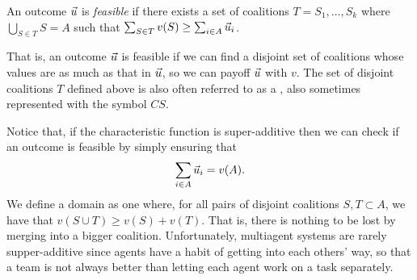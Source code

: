 \begin{definition}[Feasible]
  An outcome $\vec{u}$ is \emph{feasible} if there exists a set of
  coalitions $T = S_1,\ldots,S_k$ where $\bigcup_{S \in T} S = A$
  such that $\sum_{S \in T} v(S) \geq \sum_{i \in A} \vec{u}_i$.
\end{definition}

That is, an outcome $\vec{u}$ is feasible if we can find a disjoint set of
coalitions whose values are as much as that in $\vec{u}$, so we can payoff
$\vec{u}$ with $v$. The set of disjoint coalitions $T$ defined above is
also often referred to as a , also sometimes
represented with the symbol $CS$.

Notice that, if the characteristic function is super-additive then we
can check if an outcome \vu{} is feasible by simply ensuring that
\begin{equation}
  \label{eq:gt-7}
  \sum_{i \in A} \vec{u}_i = v(A).
\end{equation}
We define a  domain as one where, for all pairs of
disjoint coalitions $S,T \subset A$, we have that $v(S \cup T) \geq
v(S) + v(T)$. That is, there is nothing to be lost by merging into a
bigger coalition. Unfortunately, multiagent systems are rarely
supper-additive since agents have a habit of getting into each others'
way, so that a team is not always better than letting each agent work
on a task separately.

